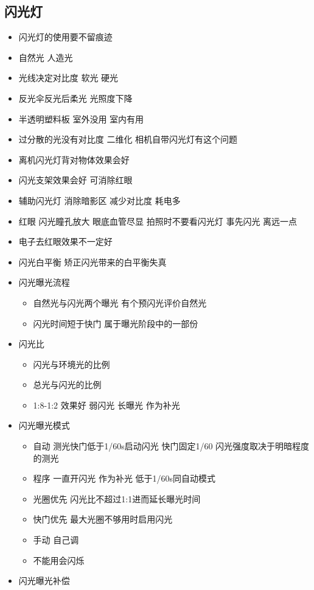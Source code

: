 \documentclass[
  letterpaper,
  DIV=11,
  numbers=noendperiod]{scrreprt}
\providecommand{\tightlist}{%
  \setlength{\itemsep}{0pt}\setlength{\parskip}{0pt}}\usepackage{longtable,booktabs,array}
\begin{document}
\subsection{闪光灯}\label{ux95eaux5149ux706f}

\begin{itemize}
\tightlist
\item
  闪光灯的使用要不留痕迹
\item
  自然光 人造光
\item
  光线决定对比度 软光 硬光
\item
  反光伞反光后柔光 光照度下降
\item
  半透明塑料板 室外没用 室内有用
\item
  过分散的光没有对比度 二维化 相机自带闪光灯有这个问题
\item
  离机闪光灯背对物体效果会好
\item
  闪光支架效果会好 可消除红眼
\item
  辅助闪光灯 消除暗影区 减少对比度 耗电多
\item
  红眼 闪光瞳孔放大 眼底血管尽显 拍照时不要看闪光灯 事先闪光 离远一点
\item
  电子去红眼效果不一定好
\item
  闪光白平衡 矫正闪光带来的白平衡失真
\item
  闪光曝光流程

  \begin{itemize}
  \tightlist
  \item
    自然光与闪光两个曝光 有个预闪光评价自然光
  \item
    闪光时间短于快门 属于曝光阶段中的一部份
  \end{itemize}
\item
  闪光比

  \begin{itemize}
  \tightlist
  \item
    闪光与环境光的比例
  \item
    总光与闪光的比例
  \item
    1:8-1:2 效果好 弱闪光 长曝光 作为补光
  \end{itemize}
\item
  闪光曝光模式

  \begin{itemize}
  \tightlist
  \item
    自动 测光快门低于1/60s启动闪光 快门固定1/60
    闪光强度取决于明暗程度的测光
  \item
    程序 一直开闪光 作为补光 低于1/60s同自动模式
  \item
    光圈优先 闪光比不超过1:1进而延长曝光时间
  \item
    快门优先 最大光圈不够用时启用闪光
  \item
    手动 自己调
  \item
    不能用会闪烁
  \end{itemize}
\item
  闪光曝光补偿


\end{itemize}
\end{document}
